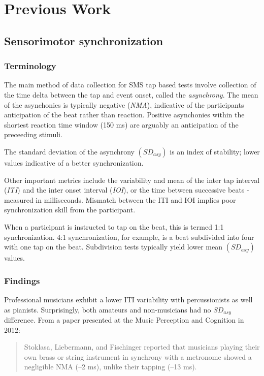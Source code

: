 \chapter{Previous Work}

\section{Sensorimotor synchronization}
\subsection{Terminology}
The main method of data collection for SMS tap based tests involve collection of the time delta between the tap and event onset, called the \textit{asynchrony}. The mean of the asynchonies is typically negative (\textit{NMA}), indicative of the participants anticipation of the beat rather than reaction. Positive asynchonies within the shortest reaction time window (150 ms) are arguably an anticipation of the preceeding stimuli. 

The standard deviation of the asynchrony $(SD_{asy})$ is an index of stability; lower values indicative of a better synchronization.  \cite{repp2013sensorimotor}

Other important metrics include the variability and mean of the inter tap interval (\textit{ITI}) and the inter onset interval (\textit{IOI}), or the time between successive beats - measured in milliseconds. Mismatch between the ITI and IOI implies poor synchronization skill from the participant. 

When a participant is instructed to tap on the beat, this is termed 1:1 synchronization. 4:1 synchronization, for example, is a beat subdivided into four with one tap on the beat. Subdivision tests typically yield lower mean $(SD_{asy})$ values. \cite{repp2013sensorimotor}

\subsection{Findings}
Professional musicians exhibit a lower ITI variability with percussionists as well as pianists. Surprisingly, both amateurs and non-musicians had no $SD_{asy}$ difference. From a paper presented at the Music Perception and Cognition in 2012:
\begin{quotation}
    Stoklasa, Liebermann, and Fischinger reported that musicians playing their own brass or string instrument in synchrony with a metronome showed a negligible NMA (–2 ms), unlike their tapping (–13 ms). \cite{repp2013sensorimotor}
\end{quotation}

